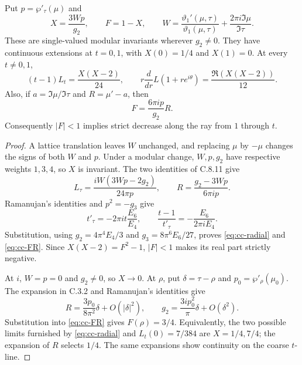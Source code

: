 \begin{statement}
Put $p=\wp'_\tau(\mu)$ and
\[
 X=\frac{3Wp}{g_2},\qquad F=1-X,
 \qquad W=\frac{\vartheta_1'(\mu,\tau)}{\vartheta_1(\mu,\tau)}
              +\frac{2\pi i\Im\mu}{\Im\tau}.
\]
These are single-valued modular invariants wherever $g_2\ne0$.
They have continuous extensions at $t=0,1$, with
$X(0)=1/4$ and $X(1)=0$. At every $t\ne0,1$,
\begin{equation}\label{eq:cc-radial}
 (t-1)L_t=\frac{X(X-2)}{24},\qquad
 r\frac{d}{dr}L(1+re^{i\theta})
       =\frac{\Re(X(X-2))}{12}.
\end{equation}
Also, if $a=\Im\mu/\Im\tau$ and $R=\mu'-a$, then
\begin{equation}\label{eq:cc-FR}
 F=\frac{6\pi ip}{g_2}R.
\end{equation}
Consequently $|F|<1$ implies strict decrease along the ray
from $1$ through $t$.
\end{statement}
\begin{proof}
A lattice translation leaves $W$ unchanged, and replacing $\mu$
by $-\mu$ changes the signs of both $W$ and $p$. Under a modular
change, $W,p,g_2$ have respective weights $1,3,4$, so $X$ is
invariant. The two identities of C.8.11 give
\[
 L_\tau=\frac{iW(3Wp-2g_2)}{24\pi p},\qquad
 R=\frac{g_2-3Wp}{6\pi ip}.
\]
Ramanujan's identities and $p^2=-g_3$ give
\[
 t'_\tau=-2\pi it\frac{E_6}{E_4},\qquad
 \frac{t-1}{t'_\tau}=-\frac{E_6}{2\pi iE_4}.
\]
Substitution, using $g_2=4\pi^4E_4/3$ and
$g_3=8\pi^6E_6/27$, proves \eqref{eq:cc-radial} and
\eqref{eq:cc-FR}. Since $X(X-2)=F^2-1$, $|F|<1$ makes
its real part strictly negative.

At $i$, $W=p=0$ and $g_2\ne0$, so $X\to0$. At $\rho$, put $\delta=\tau-\rho$ and $p_0=\wp'_\rho(\mu_0)$.
The expansion in C.3.2 and Ramanujan's identities give
\[
 R=\frac{3p_0}{8\pi^2}\delta+O(|\delta|^2),\qquad
 g_2=\frac{3ip_0^2}{\pi}\delta+O(\delta^2).
\]
Substitution into \eqref{eq:cc-FR} gives $F(\rho)=3/4$.
Equivalently, the two possible limits furnished by
\eqref{eq:cc-radial} and $L_t(0)=7/384$ are $X=1/4,7/4$;
the expansion of $R$ selects $1/4$. The same expansions show
continuity on the coarse $t$-line.
\end{proof}

